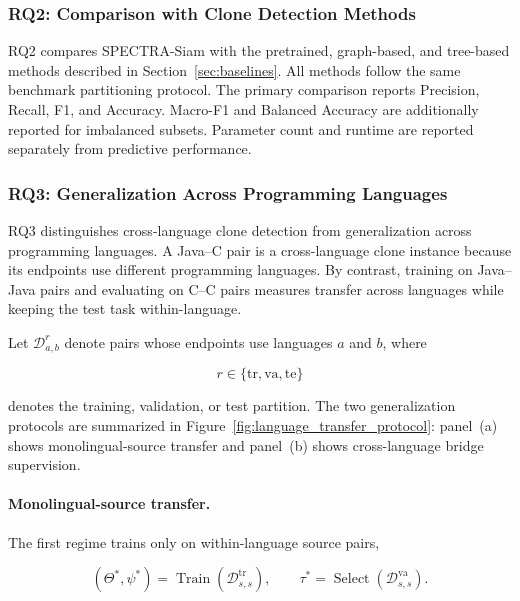 \documentclass[authoryear,final,5p,times,twocolumn]{elsarticle}
\theoremstyle{plain}
\begin{document}
\subsubsection{RQ2: Comparison with Clone Detection Methods}
\label{sec:rq2_evaluation}

RQ2 compares SPECTRA-Siam with the pretrained, graph-based, and tree-based
methods described in Section~\ref{sec:baselines}. All methods follow the same
benchmark partitioning protocol. The primary comparison reports Precision,
Recall, F1, and Accuracy. Macro-F1 and Balanced Accuracy are additionally
reported for imbalanced subsets. Parameter count and runtime are reported
separately from predictive performance.


\subsubsection{RQ3: Generalization Across Programming Languages}
\label{sec:rq3_evaluation}

RQ3 distinguishes cross-language clone detection from generalization across
programming languages. A Java--C pair is a cross-language clone instance
because its endpoints use different programming languages. By contrast,
training on Java--Java pairs and evaluating on C--C pairs measures transfer
across languages while keeping the test task within-language.

Let $\mathcal{D}_{a,b}^{r}$ denote pairs whose endpoints use languages $a$
and $b$, where

\begin{equation}
r
\in
\{
    \mathrm{tr},
    \mathrm{va},
    \mathrm{te}
\}
\end{equation}

denotes the training, validation, or test partition. The two generalization
protocols are summarized in Figure~\ref{fig:language_transfer_protocol}:
panel~(a) shows monolingual-source transfer and panel~(b) shows
cross-language bridge supervision.

\paragraph{Monolingual-source transfer.}
The first regime trains only on within-language source pairs,

\begin{equation}
\label{eq:within_language_transfer}
(\Theta^{*},\psi^{*})
=
\operatorname{Train}
\left(
    \mathcal{D}_{s,s}^{\mathrm{tr}}
\right),
\qquad
\tau^{*}
=
\operatorname{Select}
\left(
    \mathcal{D}_{s,s}^{\mathrm{va}}
\right).
\end{equation}
\end{document}
